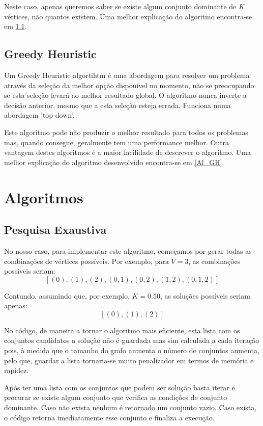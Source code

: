 \documentclass{revdetua}
\begin{document}
Neste caso, apenas queremos saber se existe algum conjunto dominante de $K$ vértices, não quantos existem. Uma melhor explicação do algoritmo encontra-se em \ref{Al_Ex}. 

\subsection{Greedy Heuristic}
Um Greedy Heuristic algortihtm é uma abordagem para resolver um problema através da seleção da melhor opção disponível no momento, não se preocupando se esta seleção levará ao melhor resultado global. O algoritmo nunca inverte a decisão anterior, mesmo que a esta seleção esteja errada. Funciona numa abordagem 'top-down'.\cite{programiz}

Este algoritmo pode não produzir o melhor resultado para todos os problemas mas, quando consegue, geralmente tem uma performance melhor. Outra vantagem destes algoritmos é a maior facilidade de descrever o algoritmo. Uma melhor explicação do algoritmo desenvolvido encontra-se em \ref{Al_GH}. 

\section{Algoritmos}
\subsection{Pesquisa Exaustiva}
\label{Al_Ex}
No nosso caso, para implementar este algoritmo, começamos por gerar todas as combinações de vértices possíveis. Por exemplo, para $V = 3$, as combinações possíveis seriam:
\[
[(0), (1), (2), (0, 1), (0, 2), (1, 2), (0, 1, 2)]
\]

Contundo, assumindo que, por exemplo, $K = 0.50$, as soluções possíveis seriam apenas:
\[
[(0), (1), (2)]
\]

No código, de maneira a tornar o algoritmo mais eficiente, esta lista com os conjuntos candidatos a solução não é guardada mas sim calculada a cada iteração pois, à medida que o tamanho do grafo aumenta o número de conjuntos aumenta, pelo que, guardar a lista tornaria-se muito penalizador em termos de memória e rapidez.

Após ter uma lista com os conjuntos que podem ser solução basta iterar e procurar se existe algum conjunto que verifica as condições de conjunto dominante. Caso não exista nenhum é retornado um conjunto vazio. Caso exista, o código retorna imediatamente esse conjunto e finaliza a execução.
\end{document}
